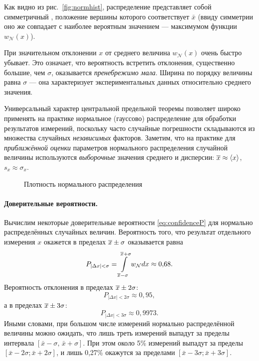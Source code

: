 Как видно из рис.~\ref{fig:normhist}, распределение представляет собой
симметричный
, положение вершины которого
соответствует $\bar{x}$ (ввиду симметрии оно же
совпадает с наиболее вероятным значением --- максимумом
функции $w_{\mathcal{N}}(x)$).

При значительном отклонении $x$ от среднего величина
$w_{\mathcal{N}}\!\left(x\right)$
очень быстро убывает. Это означает, что вероятность встретить отклонения,
существенно большие, чем $\sigma$, оказывается \emph{пренебрежимо
мала}. Ширина  по порядку величины
равна $\sigma$ --- она характеризует 
экспериментальных данных относительно среднего значения.


Универсальный характер центральной предельной теоремы позволяет широко
применять на практике нормальное (гауссово) распределение для обработки
результатов измерений, поскольку часто случайные погрешности складываются из
множества случайных \emph{независимых} факторов. Заметим, что на практике
для \emph{приближённой оценки} параметров нормального распределения
случайной величины используются \emph{выборочные} значения среднего
и дисперсии: $\overline{x}\approx\left<x\right>$, $s_{x}\approx\sigma_{x}$.

\begin{figure}[h]
    \centering
    
    \caption{Плотность нормального распределения}
\end{figure}

\paragraph{Доверительные вероятности.}
Вычислим некоторые доверительные вероятности \eqref{eq:confidenceP} для нормально
распределённых случайных величин.
Вероятность того, что результат отдельного измерения $x$ окажется
в пределах $\overline{x}\pm\sigma$ оказывается равна
\[
P_{\left|\Delta x\right|<\sigma} =
\int\limits_{\overline{x}-\sigma}^{\overline{x}+\sigma}
w_{\mathcal{N}} dx \approx0{,}68.
\]
Вероятность отклонения в пределах $\overline{x}\pm2\sigma$:
\[
P_{\left|\Delta x\right|<2\sigma}\approx0{,}95,
\]
а в пределах $\overline{x}\pm3\sigma$:
\[
P_{\left|\Delta x\right|<3\sigma}\approx0{,}9973.
\]
Иными словами, при большом числе измерений нормально распределённой
величины можно ожидать, что лишь треть измерений выпадут за пределы интервала
$\left[\bar{x}-\sigma,\,\bar{x}+\sigma\right]$. При этом около 5\%
измерений выпадут за пределы $\left[\bar{x}-2\sigma;\bar{x}+2\sigma\right]$,
и лишь 0,27\% окажутся за пределами
$\left[\bar{x}-3\sigma;\bar{x}+3\sigma\right]$.

